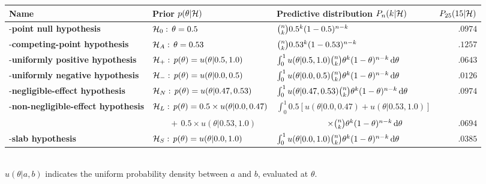 \begin{tcolorbox}[title=Box~2: Model definitions and equations,code={\singlespacing}]
\tiny\centering\begin{tabular}{lllr}\hline
Name & Prior $p(\theta|{\mathcal{H}})$  & Predictive distribution $P_n(k|{\mathcal{H}})$&$P_{25}(15|{\mathcal{H}})$\\[1ex]\hline
\hyp{\textbf{point null hypothesis}} 
		& ${\mathcal{H}}_0:\,\theta = 0.5$                        
		& $\binom{n}{k} 0.5^k (1-0.5)^{n-k}$ 
		& $.0974$
		\\[1ex]
\hyp{\textbf{competing-point hypothesis}}
		& ${\mathcal{H}}_A:\,\theta = 0.53$
		& $\binom{n}{k} 0.53^k (1-0.53)^{n-k}$ 
		& $.1257$
		\\[1ex]
\hyp{\textbf{uniformly positive hypothesis}}
		& ${\mathcal{H}}_+:\,p(\theta) = u(\theta|0.5, 1.0)$            
		& $\int_0^1 u(\theta|0.5, 1.0) \binom{n}{k} \theta^k (1-\theta)^{n-k} \mathop{}\!\mathrm{d}\theta$ 
		& $.0643$
		\\[1ex]
\hyp{\textbf{uniformly negative hypothesis}}
		& ${\mathcal{H}}_-:\,p(\theta) = u(\theta|0.0, 0.5)$
		& $\int_0^1 u(\theta|0.0, 0.5) \binom{n}{k} \theta^k (1-\theta)^{n-k} \mathop{}\!\mathrm{d}\theta$
		& $.0126$
		\\[1ex]
\hyp{\textbf{negligible-effect hypothesis}} 
		& ${\mathcal{H}}_N:\,p(\theta) = u(\theta|0.47, 0.53)$ 
		& $\int_0^1 u(\theta|0.47, 0.53) \binom{n}{k} \theta^k (1-\theta)^{n-k} \mathop{}\!\mathrm{d}\theta$
		& $.0974$
		\\[1ex]
\hyp{\textbf{non-negligible-effect hypothesis}}
		& ${\mathcal{H}}_L:\,p(\theta) = 0.5 \times u(\theta|0.0, 0.47)$ 
		& $\int_0^1 0.5\left[u(\theta|0.0, 0.47) + u(\theta|0.53, 1.0)\right]$\\
		& $\qquad{+}{\,}0.5 \times u(\theta|0.53, 1.0)$
		& $\qquad\qquad\qquad \times \binom{n}{k} \theta^k (1-\theta)^{n-k} \mathop{}\!\mathrm{d}\theta$ 
		& $.0694$
		\\[1ex]
\hyp{\textbf{slab hypothesis}} 
		& ${\mathcal{H}}_S:\,p(\theta) = u(\theta|0.0, 1.0)$
		& $\int_0^1 u(\theta|0.0, 1.0) \binom{n}{k} \theta^k (1-\theta)^{n-k} \mathop{}\!\mathrm{d}\theta$
		& $.0385$
		\\[1ex]\hline
\end{tabular}\\
\indent\flushleft\small $u(\theta|a,b)$ indicates the uniform probability density between $a$ and $b$, evaluated at $\theta$.
\end{tcolorbox}


